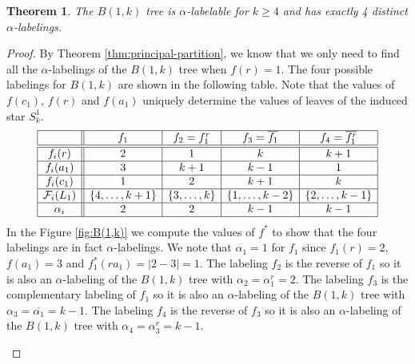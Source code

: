 \documentclass[10pt]{article}
\newtheorem{theorem}{Theorem}
\theoremstyle{definition}
\begin{document}
\begin{theorem}
  The $B(1, k)$ tree is $\alpha$-labelable for $k \geq 4$ and has exactly 4 distinct $\alpha$-labelings.
\end{theorem}

\begin{proof}
  By Theorem \ref{thm:principal-partition}, we know that we only need to find all the $\alpha$-labelings of the $B(1, k)$ tree when $f(r) = 1$. The four possible labelings for $B(1, k)$ are shown in the following table. Note that the values of $f(c_1)$, $f(r)$ and $f(a_1)$ uniquely determine the values of leaves of the induced star $S_k^1$.
  $$
  \begin{array}{|c||c|c|c|c|}
    \hline
    & f_1 & f_2 = f_1^r & f_3 = \overline{f_1} & f_4= \overline{f_1^r} \\
    \hline \hline
    f_i(r) & 2 & 1 & k & k+1 \\
    \hline
    f_i(a_1) & 3 & k+1 & k-1 & 1 \\
    \hline
    f_i(c_1) & 1 & 2 & k+1 & k \\
    \hline
    \mathcal{F}_i(L_1) & \{4, \ldots, k+1\} & \{3, \ldots, k\} & \{1, \ldots, k-2\} & \{2, \ldots, k-1\} \\
    \hline
    \alpha_i & 2 & 2 & k-1 & k-1 \\
    \hline
  \end{array}
  \label{tab:alpha-labelings}
  $$
  In the Figure \ref{fig:B(1,k)} we compute the values of $f^*$ to show that the four labelings are in fact $\alpha$-labelings.  We note that $\alpha_1 = 1$ for $f_1$ since $f_1(r) = 2$, $f(a_1) = 3$ and $f_1^*(r a_1) = |2-3|=1$. The labeling $f_2$ is the reverse of $f_1$ so it is also an $\alpha$-labeling of the $B(1,k)$ tree with $\alpha_2 = \alpha_1^r = 2$. The labeling $f_3$ is the complementary labeling of $f_1$ so it is also an $\alpha$-labeling of the $B(1,k)$ tree with $\alpha_3 = \overline{\alpha_1} = k - 1$. The labeling $f_4$ is the reverse of $f_3$ so it is also an $\alpha$-labeling of the $B(1,k)$ tree with $\alpha_4 = \alpha_3^r = k - 1$.

  \begin{figure}[H]
    \centering
    \begin{minipage}{0.4\textwidth}
      \centering
\end{minipage}
\end{figure}
\end{proof}
\end{document}
